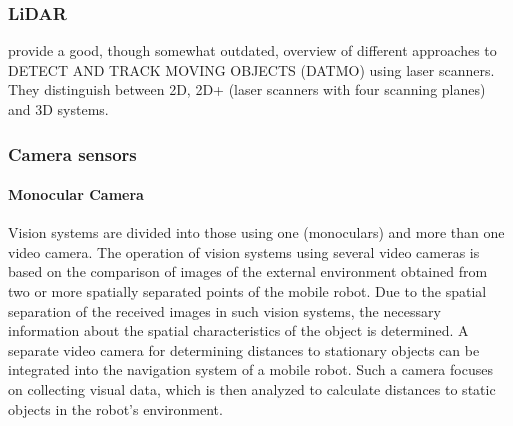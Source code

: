 \subsubsection*{LiDAR}

\cite{Mertz2013} provide a good, though somewhat outdated, overview of different approaches to DETECT AND TRACK MOVING OBJECTS (DATMO) using laser scanners. They distinguish between 2D, 2D+ (laser scanners with four scanning planes) and 3D systems.



\subsubsection{Camera sensors}
\paragraph{Monocular Camera}
Vision systems are divided into those using one (monoculars) and more than one video camera. The operation of vision systems using several video cameras is based on the comparison of images of the external environment obtained from two or more spatially separated points of the mobile robot. Due to the spatial separation of the received images in such vision systems, the necessary information about the spatial characteristics of the object is determined. 
A separate video camera for determining distances to stationary objects can be integrated into the navigation system of a mobile robot. Such a camera focuses on collecting visual data, which is then analyzed to calculate distances to static objects in the robot's environment.

